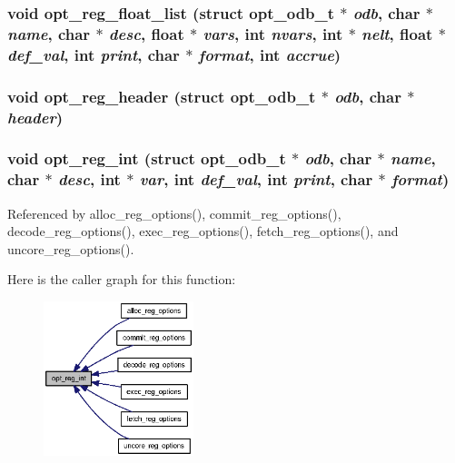 \subsubsection[{opt\_\-reg\_\-float\_\-list}]{\setlength{\rightskip}{0pt plus 5cm}void opt\_\-reg\_\-float\_\-list (struct {\bf opt\_\-odb\_\-t} $\ast$ {\em odb}, \/  char $\ast$ {\em name}, \/  char $\ast$ {\em desc}, \/  float $\ast$ {\em vars}, \/  int {\em nvars}, \/  int $\ast$ {\em nelt}, \/  float $\ast$ {\em def\_\-val}, \/  int {\em print}, \/  char $\ast$ {\em format}, \/  int {\em accrue})}\label{options_8h_9772b1fbca529f89d3fed92c00159626}


\subsubsection[{opt\_\-reg\_\-header}]{\setlength{\rightskip}{0pt plus 5cm}void opt\_\-reg\_\-header (struct {\bf opt\_\-odb\_\-t} $\ast$ {\em odb}, \/  char $\ast$ {\em header})}\label{options_8h_e5fc90dec7d9a246d2dded1b0c8ba56d}


\subsubsection[{opt\_\-reg\_\-int}]{\setlength{\rightskip}{0pt plus 5cm}void opt\_\-reg\_\-int (struct {\bf opt\_\-odb\_\-t} $\ast$ {\em odb}, \/  char $\ast$ {\em name}, \/  char $\ast$ {\em desc}, \/  int $\ast$ {\em var}, \/  int {\em def\_\-val}, \/  int {\em print}, \/  char $\ast$ {\em format})}\label{options_8h_3c40c51f020768250172b4231275584e}




Referenced by alloc\_\-reg\_\-options(), commit\_\-reg\_\-options(), decode\_\-reg\_\-options(), exec\_\-reg\_\-options(), fetch\_\-reg\_\-options(), and uncore\_\-reg\_\-options().

Here is the caller graph for this function:\nopagebreak
\begin{figure}[H]
\begin{center}
\leavevmode
\includegraphics[width=124pt]{options_8h_3c40c51f020768250172b4231275584e_icgraph}
\end{center}
\end{figure}
